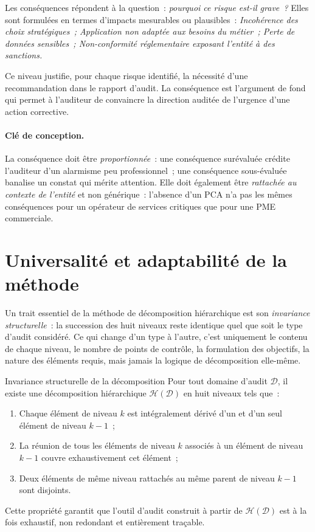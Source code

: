 Les conséquences répondent à la question~: \emph{pourquoi ce risque est-il
grave~?} Elles sont formulées en termes d'impacts mesurables ou plausibles~:
\emph{Incohérence des choix stratégiques~; Application non adaptée aux besoins
du métier~; Perte de données sensibles~; Non-conformité réglementaire exposant
l'entité à des sanctions.}

Ce niveau justifie, pour chaque risque identifié, la nécessité d'une
recommandation dans le rapport d'audit. La conséquence est l'argument de fond
qui permet à l'auditeur de convaincre la direction auditée de l'urgence d'une
action corrective.

\paragraph{Clé de conception.}
La conséquence doit être \emph{proportionnée}~: une conséquence surévaluée
crédite l'auditeur d'un alarmisme peu professionnel~; une conséquence
sous-évaluée banalise un constat qui mérite attention. Elle doit également être
\emph{rattachée au contexte de l'entité} et non générique~: l'absence d'un PCA
n'a pas les mêmes conséquences pour un opérateur de services critiques que pour
une PME commerciale.

\section{Universalité et adaptabilité de la méthode}
\label{sec:universalite}

Un trait essentiel de la méthode de décomposition hiérarchique est son
\emph{invariance structurelle}~: la succession des huit niveaux reste identique
quel que soit le type d'audit considéré. Ce qui change d'un type à l'autre,
c'est uniquement le contenu de chaque niveau, le nombre de points de
contrôle, la formulation des objectifs, la nature des éléments requis, mais
jamais la logique de décomposition elle-même.

\begin{boiteTheoreme}{Invariance structurelle de la décomposition}
Pour tout domaine d'audit $\mathcal{D}$, il existe une décomposition
hiérarchique $\mathcal{H}(\mathcal{D})$ en huit niveaux tels que~:
\begin{enumerate}
  \item Chaque élément de niveau $k$ est intégralement dérivé d'un et d'un seul
        élément de niveau $k-1$~;
  \item La réunion de tous les éléments de niveau $k$ associés à un élément
        de niveau $k-1$ couvre exhaustivement cet élément~;
  \item Deux éléments de même niveau rattachés au même parent de niveau
        $k-1$ sont disjoints.
\end{enumerate}
Cette propriété garantit que l'outil d'audit construit à partir de
$\mathcal{H}(\mathcal{D})$ est à la fois exhaustif, non redondant et
entièrement traçable.
\end{boiteTheoreme}

